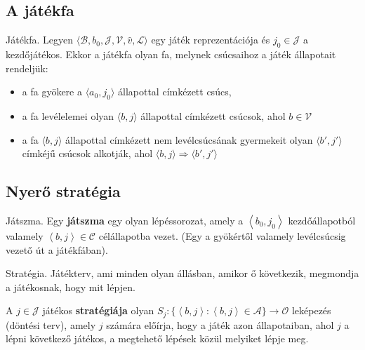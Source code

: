 \subsection{A játékfa}

\begin{definicio}
    Játékfa.
    Legyen $\langle \mathcal{B}, b_0, \mathcal{J}, \mathcal{V}, \hat{v},
    \mathcal{L} \rangle$ egy játék reprezentációja és $j_0 \in \mathcal{J}$ a
    kezdőjátékos. Ekkor a játékfa olyan fa, melynek csúcsaihoz a játék
    állapotait rendeljük:
    \begin{itemize}
        \item a fa gyökere a $\langle a_0, j_0 \rangle$ állapottal címkézett csúcs,
        \item a fa levélelemei olyan $\langle b, j \rangle$ állapottal
            címkézett csúcsok, ahol  $b \in \mathcal{V}$
        \item a fa $\langle b, j \rangle$ állapottal címkézett nem levélcsúcsának
            gyermekeit olyan $\langle b', j' \rangle$ címkéjű csúcsok alkotják, ahol
            $\langle b, j \rangle \Rightarrow \langle b', j' \rangle$
    \end{itemize}
\end{definicio}


\subsection{Nyerő stratégia}

\begin{definicio}
    Játszma.
    Egy {\bf játszma} egy olyan lépéssorozat, amely a $\left<b_0, j_0 \right>$
    kezdőállapotból valamely $\left<b,j \right> \in \mathcal{C}$ célállapotba
    vezet. (Egy a gyökértől valamely levélcsúcsig vezető út a játékfában).
\end{definicio}

\begin{definicio}
    Stratégia.
    Játékterv, ami minden olyan állásban, amikor ő következik, megmondja a
    játékosnak, hogy mit lépjen.

    A $j\in\mathcal{J}$ játékos {\bf stratégiája} olyan $S_j : \{\left<b,j
    \right> : \left<b,j \right> \in \mathcal{A}\} \to \mathcal{O}$ leképezés
    (döntési terv), amely $j$ számára előírja, hogy a játék azon állapotaiban,
    ahol  $j$ a lépni következő játékos, a megtehető lépések közül melyiket
    lépje meg.
\end{definicio}

